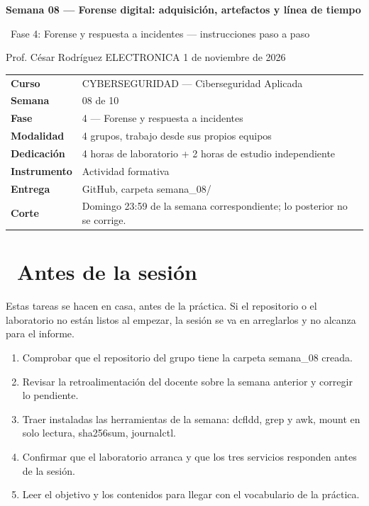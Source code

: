 \documentclass[11pt,a4paper]{article}
\newcommand{\iconoBanda}{microchip}
\newcommand{\bandaTitulo}[3][fondoOscuro]{%
  \begin{tcolorbox}[
    enhanced,
    colback=#1, colframe=#1,
    boxrule=0pt, arc=8pt, outer arc=8pt,
    width=\linewidth,
    top=18pt, bottom=6pt, left=14pt, right=14pt,
    borderline south={3.5pt}{0pt}{cyanNeon},
  ]
    \begin{minipage}[c]{0.07\linewidth}
      \centering
      \textcolor{cyanNeon}{\fontsize{30}{30}\selectfont\faIcon{\iconoBanda}}
    \end{minipage}%
    \hspace{8pt}%
    \begin{minipage}[c]{0.88\linewidth}
      {\fontsize{20}{24}\selectfont\bfseries\color{white}#2}\par\vspace{5pt}%
      \textcolor{cyanNeon!80!white}{\small\faIcon{angle-right}~#3}%
    \end{minipage}
    \vspace{4pt}
  \end{tcolorbox}%
  \vspace{8pt}%
}
\newcommand{\iconotexto}[2]{\textcolor{cyanNeon}{\faIcon{#1}}~#2}
\renewcommand{\iconoBanda}{shield-alt}
\begin{document}
\bandaTitulo[fondoOscuro]{Semana 08 --- Forense digital: adquisición, artefactos y línea de tiempo}{Fase 4: Forense y respuesta a incidentes --- instrucciones paso a paso}

\begin{center}\small\color{grisTexto}Prof. César Rodríguez \textbar{} ELECTRONICA \textbar{} 1 de noviembre de 2026\end{center}

\begin{tabularx}{\linewidth}{@{}>{\raggedright\arraybackslash}p{4.6cm}X@{}}
\toprule
\textbf{Curso} & CYBERSEGURIDAD --- Ciberseguridad Aplicada \\
\textbf{Semana} & 08 de 10 \\
\textbf{Fase} & 4 --- Forense y respuesta a incidentes \\
\textbf{Modalidad} & 4 grupos, trabajo desde sus propios equipos \\
\textbf{Dedicación} & 4 horas de laboratorio + 2 horas de estudio independiente \\
\textbf{Instrumento} & Actividad formativa \\
\textbf{Entrega} & GitHub, carpeta semana\_08/ \\
\textbf{Corte} & Domingo 23:59 de la semana correspondiente; lo posterior no se corrige. \\
\bottomrule
\end{tabularx}

\section{\iconotexto{clock}{Antes de la sesión}}

Estas tareas se hacen en casa, antes de la práctica. Si el repositorio o el laboratorio no están listos al empezar, la sesión se va en arreglarlos y no alcanza para el informe.

\begin{enumerate}[leftmargin=1.4em,itemsep=2pt,topsep=3pt]
  \item Comprobar que el repositorio del grupo tiene la carpeta semana\_08 creada.
  \item Revisar la retroalimentación del docente sobre la semana anterior y corregir lo pendiente.
  \item Traer instaladas las herramientas de la semana: dcfldd, grep y awk, mount en solo lectura, sha256sum, journalctl.
  \item Confirmar que el laboratorio arranca y que los tres servicios responden antes de la sesión.
  \item Leer el objetivo y los contenidos para llegar con el vocabulario de la práctica.
\end{enumerate}
\end{document}
